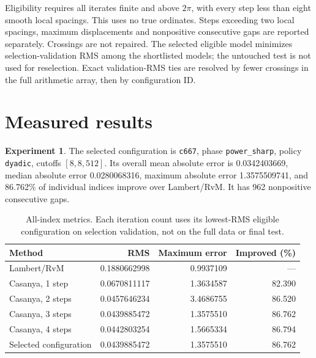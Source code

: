 \documentclass[11pt]{amsart}
\numberwithin{equation}{section}
\theoremstyle{definition}\newtheorem{definition}[proposition]{Definition}
\newtheorem{experiment}[proposition]{Experiment}
\theoremstyle{remark}\newtheorem{remark}[proposition]{Remark}
\begin{document}
Eligibility requires all iterates finite and above $2\pi$, with every step
less than eight smooth local spacings. This uses no true ordinates.
Steps exceeding two local spacings, maximum displacements and nonpositive
consecutive gaps are reported separately. Crossings are not repaired.
The selected eligible model minimizes selection-validation RMS among the
shortlisted models; the untouched test is not used for reselection.
Exact validation-RMS ties are resolved by fewer crossings in the full
arithmetic array, then by configuration ID.

\section{Measured results}\label{sec:results}
\begin{experiment}\label{exp:results}
The selected configuration is \texttt{c667}, phase \texttt{power\_sharp},
policy \texttt{dyadic}, cutoffs $[8, 8, 512]$.
Its overall mean absolute error is 0.0342403669, median absolute error 0.0280068316,
maximum absolute error 1.3575509741, and 86.762\% of individual indices improve
over Lambert/RvM. It has 962 nonpositive consecutive gaps.
\end{experiment}

\begin{table}[htbp]\centering\small
\caption{All-index metrics. Each iteration count uses its lowest-RMS eligible
configuration on selection validation, not on the full data or final test.}
\label{tab:overall}
\begin{tabular}{lrrr}\toprule
Method & RMS & Maximum error & Improved (\%)\\\midrule
Lambert/RvM & 0.1880662998 & 0.9937109 & --- \\
Casanya, 1 step & 0.0670811117 & 1.3634587 & 82.390 \\
Casanya, 2 steps & 0.0457646234 & 3.4686755 & 86.520 \\
Casanya, 3 steps & 0.0439885472 & 1.3575510 & 86.762 \\
Casanya, 4 steps & 0.0442803254 & 1.5665334 & 86.794 \\
Selected configuration & 0.0439885472 & 1.3575510 & 86.762 \\
\bottomrule\end{tabular}
\end{table}
\end{document}
